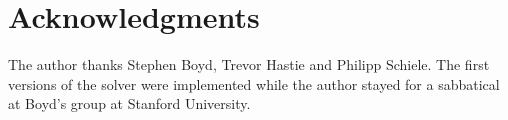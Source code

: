 \section*{Acknowledgments}

The author thanks Stephen Boyd, Trevor Hastie and Philipp Schiele. The first versions of the
solver were implemented while the author stayed for a sabbatical at Boyd's group
at Stanford University.
